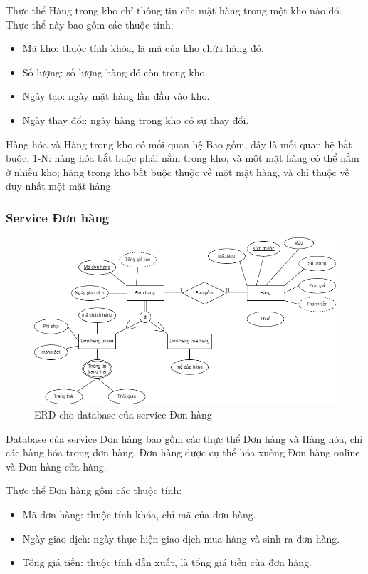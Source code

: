 \par Thực thể Hàng trong kho chỉ thông tin của mặt hàng trong một kho nào đó. Thực thể này bao gồm các thuộc tính:
\begin{itemize}
    \item Mã kho: thuộc tính khóa, là mã của kho chứa hàng đó.
    \item Số lượng: số lượng hàng đó còn trong kho.
    \item Ngày tạo: ngày mặt hàng lần đầu vào kho.
    \item Ngày thay đổi: ngày hàng trong kho có sự thay đổi.
\end{itemize}

\par Hàng hóa và Hàng trong kho có mối quan hệ Bao gồm, đây là mối quan hệ bắt buộc, 1-N: hàng hóa bắt buộc phải nằm trong kho, và một mặt hàng có thể nằm ở nhiều kho; hàng trong kho bắt buộc thuộc về một mặt hàng, và chỉ thuộc về duy nhất một mặt hàng.

\subsubsection{Service Đơn hàng}
\begin{figure}[!htp]
    \begin{center}
        \includegraphics[width=1\textwidth]{img/database/erd/shop_online-đơnhàng.png}
        \newline
        \caption{ERD cho database của service Đơn hàng}
    \end{center}
\end{figure}

\par Database của service Đơn hàng bao gồm các thực thể Đơn hàng và Hàng hóa, chỉ các hàng hóa trong đơn hàng. Đơn hàng được cụ thể hóa xuống Đơn hàng online và Đơn hàng cửa hàng.
\par Thực thể Đơn hàng gồm các thuộc tính:
\begin{itemize}
    \item Mã đơn hàng: thuộc tính khóa, chỉ mã của đơn hàng.
    \item Ngày giao dịch: ngày thực hiện giao dịch mua hàng và sinh ra đơn hàng.
    \item Tổng giá tiền: thuộc tính dẫn xuất, là tổng giá tiền của đơn hàng.
\end{itemize}

